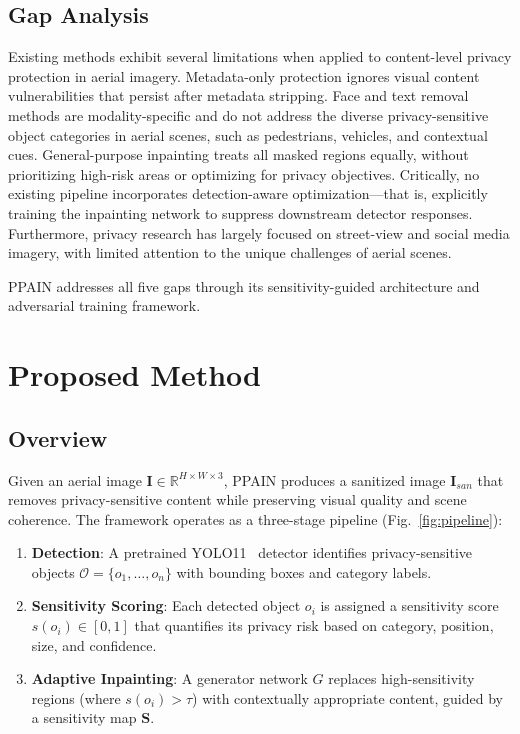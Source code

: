 \documentclass[preprint,12pt]{elsarticle}
\begin{document}
\subsection{Gap Analysis}

Existing methods exhibit several limitations when applied to content-level privacy protection in aerial imagery. Metadata-only protection ignores visual content vulnerabilities that persist after metadata stripping. Face and text removal methods are modality-specific and do not address the diverse privacy-sensitive object categories in aerial scenes, such as pedestrians, vehicles, and contextual cues. General-purpose inpainting treats all masked regions equally, without prioritizing high-risk areas or optimizing for privacy objectives. Critically, no existing pipeline incorporates detection-aware optimization---that is, explicitly training the inpainting network to suppress downstream detector responses. Furthermore, privacy research has largely focused on street-view and social media imagery, with limited attention to the unique challenges of aerial scenes.

PPAIN addresses all five gaps through its sensitivity-guided architecture and adversarial training framework.


\section{Proposed Method}
\label{sec:method}

\subsection{Overview}

Given an aerial image $\mathbf{I} \in \mathbb{R}^{H \times W \times 3}$, PPAIN produces a sanitized image $\mathbf{I}_{san}$ that removes privacy-sensitive content while preserving visual quality and scene coherence. The framework operates as a three-stage pipeline (Fig.~\ref{fig:pipeline}):

\begin{enumerate}
    \item \textbf{Detection}: A pretrained YOLO11~\cite{ultralytics2024yolo} detector identifies privacy-sensitive objects $\mathcal{O} = \{o_1, \ldots, o_n\}$ with bounding boxes and category labels.
    \item \textbf{Sensitivity Scoring}: Each detected object $o_i$ is assigned a sensitivity score $s(o_i) \in [0, 1]$ that quantifies its privacy risk based on category, position, size, and confidence.
    \item \textbf{Adaptive Inpainting}: A generator network $G$ replaces high-sensitivity regions (where $s(o_i) > \tau$) with contextually appropriate content, guided by a sensitivity map $\mathbf{S}$.
\end{enumerate}
\end{document}
